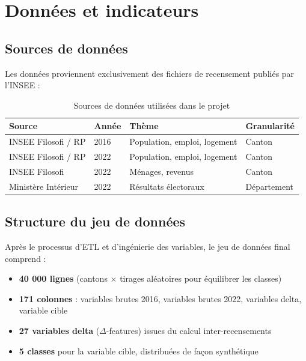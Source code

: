 \chapter{Données et indicateurs}
\label{ch:donnees}

\section{Sources de données}

Les données proviennent exclusivement des fichiers de recensement publiés par l'INSEE :

\begin{table}[H]
\centering
\caption{Sources de données utilisées dans le projet}
\label{tab:sources}
\begin{tabular}{llll}
\toprule
\textbf{Source} & \textbf{Année} & \textbf{Thème} & \textbf{Granularité} \\
\midrule
INSEE Filosofi / RP & 2016 & Population, emploi, logement & Canton \\
INSEE Filosofi / RP & 2022 & Population, emploi, logement & Canton \\
INSEE Filosofi & 2022 & Ménages, revenus & Canton \\
Ministère Intérieur & 2022 & Résultats électoraux & Département \\
\bottomrule
\end{tabular}
\end{table}

\section{Structure du jeu de données}

Après le processus d'ETL et d'ingénierie des variables, le jeu de données final
comprend :

\begin{itemize}
  \item \textbf{40 000 lignes} (cantons $\times$ tirages aléatoires pour équilibrer les classes)
  \item \textbf{171 colonnes} : variables brutes 2016, variables brutes 2022,
    variables delta, variable cible
  \item \textbf{27 variables delta} ($\Delta$-features) issues du calcul inter-recensements
  \item \textbf{5 classes} pour la variable cible, distribuées de façon synthétique
\end{itemize}

